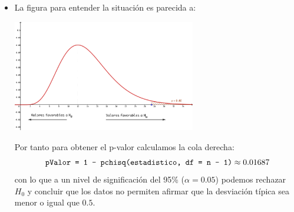 \documentclass[
  9pt,
  ignorenonframetext,
]{beamer}
\begin{document}
\begin{frame}{}
\protect\hypertarget{section}{}

\begin{itemize}
\item
  La figura para entender la situación es parecida a:

  \begin{center}\includegraphics[width=8cm]{../fig/07-05-contrasteChi2} \end{center}

  Por tanto para obtener el p-valor calculamos la cola derecha: \[
  \text{ \tt pValor = 1 - pchisq(estadistico, df = n - 1)} \approx 0.01687
  \] con lo que a un nivel de significación del 95\% (\(\alpha = 0.05\))
  podemos rechazar \(H_0\) y concluir que los datos no permiten afirmar
  que la desviación típica sea menor o igual que \(0.5\).
\end{itemize}

\end{frame}
\end{document}
